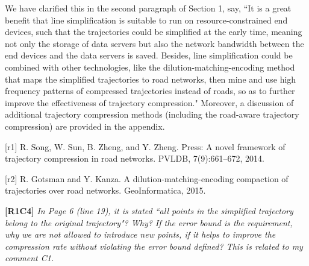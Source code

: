 \documentclass{letter}
\begin{document}
We have clarified this in the second paragraph of Section 1, say, {``It is a great benefit that line simplification is suitable to run on resource-constrained end devices, such that the trajectories could be simplified at the early time, meaning not only the storage of data servers but also the network bandwidth between the end devices and the data servers is saved. Besides, line simplification could be combined with other technologies, like the dilution-matching-encoding method that maps the simplified trajectories to road networks, then mine and use high frequency patterns of compressed trajectories instead of roads, so as to further improve the effectiveness of trajectory compression."} Moreover, a discussion of additional trajectory compression methods (including the road-aware trajectory compression) are provided in the appendix.



[r1] R. Song, W. Sun, B. Zheng, and Y. Zheng. Press: A novel framework of trajectory compression in road networks. PVLDB, 7(9):661--672, 2014.

[r2] R. Gotsman and Y. Kanza. A dilution-matching-encoding compaction of trajectories over road networks.
GeoInformatica, 2015.



\textbf{[R1C4]} \emph{ In Page 6 (line 19), it is stated ``all points in the simplified trajectory belong to the original trajectory"? Why? If the error bound is the requirement, why we are not allowed to introduce new points, if it helps to improve the compression rate without violating the error bound defined? This is related to my comment C1. }
\end{document}
